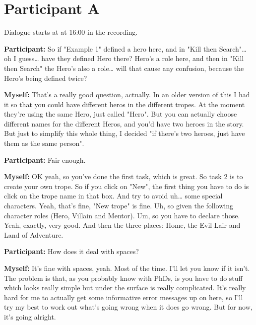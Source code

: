 \documentclass[11pt]{report}
\begin{document}
\def\usability#1{\todo[color=cyan,size=\scriptsize]{\textbf{Usability:} #1}}

\def\bug#1{\todo[color=red,size=\scriptsize]{\textbf{Limitation:} #1}}

\def\syntax#1{\todo[color=yellow,size=\scriptsize]{\textbf{Syntax:} #1}}

\section{Participant A}
Dialogue starts at at 16:00 in the recording.


\begin{linenumbers}
\textbf{Participant:} So if "Example 1" defined a hero here, and in "Kill then
Search"\ldots{} oh I guess\ldots{} have they defined Hero there? Hero's a role
here, and then in "Kill then Search" the Hero's also a role\ldots{} will that
cause any confusion, because the Hero's being defined twice?

\textbf{Myself:} That's a really good question, actually. In an older version of this I had it so that you could have different heros in the different tropes. At the moment they're using the same Hero, just called "Hero". But you can actually choose different names for the different Heros, and you'd have two heroes in the story. But just to simplify this whole thing, I decided "if there's two heroes, just have them as the same person".

\textbf{Participant:} Fair enough.

\textbf{Myself:} OK yeah, so you've done the first task, which is great. So task 2 is to create your own trope. So if you click on "New", the first thing you have to do is click on the trope name in that box. And try to avoid uh\ldots{} some special characters. Yeah, that's fine, "New trope" is fine. Uh, so given the following character roles (Hero, Villain and Mentor). Um, so you have to declare those. Yeah, exactly, very good. And then the three places: Home, the Evil Lair and Land of Adventure.

\textbf{Participant:} How does it deal with spaces?\syntax{Spaces in words}

\textbf{Myself:} It's fine with spaces, yeah. Most of the time. I'll let you know if it isn't. The problem is that, as you probably know with PhDs, is you have to do stuff which looks really simple but under the surface is really complicated. It's really hard for me to actually get some informative error messages up on here, so I'll try my best to work out what's going wrong when it does go wrong. But for now, it's going alright.


\end{linenumbers}
\end{document}
